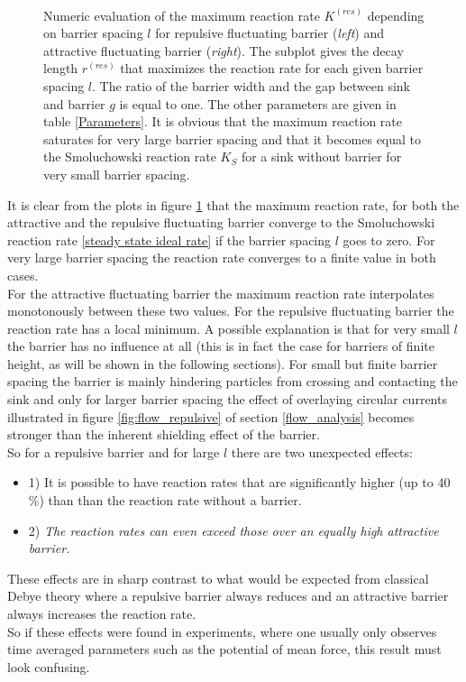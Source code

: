 \begin{figure}[t!]
\begin{minipage}[t]{.5 \textwidth}
\end{minipage}\\
\begin{minipage}[t]{1 \textwidth}
        \caption{Numeric evaluation of the maximum reaction rate $K^{(res)}$ depending on barrier spacing $l$ for repulsive fluctuating barrier (\emph{left}) and attractive fluctuating barrier (\emph{right}). The subplot gives the decay length $r^{(res)}$ that maximizes the reaction rate for each given barrier spacing $l$. The ratio of the barrier width and the gap between sink and barrier $g$ is equal to one. The other parameters are given in table \ref{Parameters}. It is obvious that the maximum reaction rate saturates for very large barrier spacing and that it becomes equal to the Smoluchowski reaction rate $K_S$ for a sink without barrier for very small barrier spacing. \label{fig:res_l}}
\end{minipage}
    \end{figure}
It is clear from the plots in figure \ref{fig:res_l} that the maximum reaction rate, for both the attractive and the repulsive fluctuating barrier converge to the Smoluchowski reaction rate \eqref{steady state ideal rate} if the barrier spacing $l$ goes to zero. For very large barrier spacing the reaction rate converges to a finite value in both cases. \\
For the attractive fluctuating barrier the maximum reaction rate interpolates monotonously between these two values. For the repulsive fluctuating barrier the reaction rate has a local minimum. A possible explanation is that for very small $l$ the barrier has no influence at all (this is in fact the case for barriers of finite height, as will be shown in the following sections). For small but finite barrier spacing the barrier is mainly hindering particles from crossing and contacting the sink and only for larger barrier spacing the effect of overlaying circular currents illustrated in figure \ref{fig:flow_repulsive} of section \ref{flow_analysis} becomes stronger than the inherent shielding effect of the barrier.\\
So for a repulsive barrier and for large $l$ there are two unexpected effects: 
\begin{itemize}
    \item{1)} It is possible to have reaction rates that are significantly higher (up to 40 \%) than than the reaction rate without a barrier. 
    \item{2)} \emph{The reaction rates can even exceed those over an equally high attractive barrier.}
\end{itemize}
These effects are in sharp contrast to what would be expected from classical Debye theory where a repulsive barrier always reduces and an attractive barrier always increases the reaction rate. \\
So if these effects were found in experiments, where one usually only observes time averaged parameters such as the potential of mean force, this result must look confusing. 

